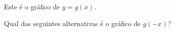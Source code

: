 \begin{question}
\begin{instance}
\begin{mcq}[standalone=true]
\begin{stem}
Este é o gráfico de $y=g(x)$. \par
Qual das seguintes alternativas é o gráfico de $g(-x)$? \par

\end{stem}
\begin{distractors}

\end{distractors}

\end{mcq}

\end{instance}

\end{question}
